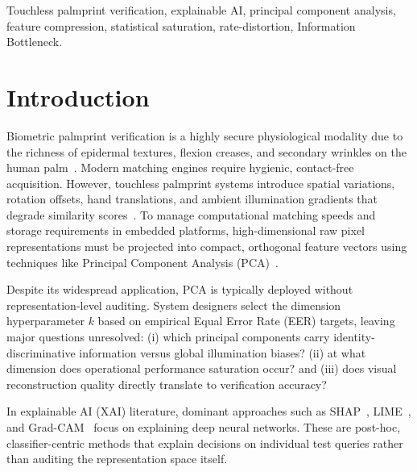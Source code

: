 \documentclass[conference]{IEEEtran}
\begin{document}
\begin{IEEEkeywords}
Touchless palmprint verification, explainable AI, principal component analysis, feature compression, statistical saturation, rate-distortion, Information Bottleneck.
\end{IEEEkeywords}

\section{Introduction}
\label{sec:introduction}

Biometric palmprint verification is a highly secure physiological modality due to the richness of epidermal textures, flexion creases, and secondary wrinkles on the human palm~\cite{zhang2003online, kong2009survey}. Modern matching engines require hygienic, contact-free acquisition. However, touchless palmprint systems introduce spatial variations, rotation offsets, hand translations, and ambient illumination gradients that degrade similarity scores~\cite{kumar2008incorporating}. To manage computational matching speeds and storage requirements in embedded platforms, high-dimensional raw pixel representations must be projected into compact, orthogonal feature vectors using techniques like Principal Component Analysis (PCA)~\cite{lu2003palmprint}.

Despite its widespread application, PCA is typically deployed without representation-level auditing. System designers select the dimension hyperparameter $k$ based on empirical Equal Error Rate (EER) targets, leaving major questions unresolved: (i) which principal components carry identity-discriminative information versus global illumination biases? (ii) at what dimension does operational performance saturation occur? and (iii) does visual reconstruction quality directly translate to verification accuracy?

In explainable AI (XAI) literature, dominant approaches such as SHAP~\cite{lundberg2017shap}, LIME~\cite{ribeiro2016lime}, and Grad-CAM~\cite{selvaraju2017gradcam} focus on explaining deep neural networks. These are post-hoc, classifier-centric methods that explain decisions on individual test queries rather than auditing the representation space itself. 
\end{document}
